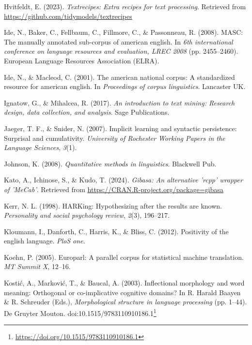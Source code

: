 \documentclass[
  letterpaper,
]{book}
\newlength{\cslhangindent}
\newenvironment{CSLReferences}[2] %
 {\begin{list}{}{%
  \setlength{\itemindent}{0pt}
  \setlength{\leftmargin}{0pt}
  \setlength{\parsep}{0pt}
  \ifodd #1
   \setlength{\leftmargin}{\cslhangindent}
   \setlength{\itemindent}{-1\cslhangindent}
  \fi
  \setlength{\itemsep}{#2\baselineskip}}}
 {\end{list}}
\theoremstyle{definition}
\theoremstyle{remark}
\DeclareRobustCommand{\href}[2]{#2\footnote{\url{#1}}}
\begin{document}
\begin{CSLReferences}{1}{0}
Hvitfeldt, E. (2023). \emph{Textrecipes: Extra recipes for text
processing}. Retrieved from
\url{https://github.com/tidymodels/textrecipes}

Ide, N., Baker, C., Fellbaum, C., Fillmore, C., \& Passonneau, R.
(2008). MASC: The manually annotated sub-corpus of american english. In
\emph{6th international conference on language resources and evaluation,
LREC 2008} (pp. 2455--2460). European Language Resources Association
(ELRA).

Ide, N., \& Macleod, C. (2001). The american national corpus: A
standardized resource for american english. In \emph{Proceedings of
corpus linguistics}. Lancaster UK.

Ignatow, G., \& Mihalcea, R. (2017). \emph{An introduction to text
mining: Research design, data collection, and analysis}. Sage
Publications.

Jaeger, T. F., \& Snider, N. (2007). Implicit learning and syntactic
persistence: Surprisal and cumulativity. \emph{University of Rochester
Working Papers in the Language Sciences}, \emph{3}(1).

Johnson, K. (2008). \emph{Quantitative methods in linguistics}.
Blackwell Pub.

Kato, A., Ichinose, S., \& Kudo, T. (2024). \emph{Gibasa: An alternative
'rcpp' wrapper of 'MeCab'}. Retrieved from
\url{https://CRAN.R-project.org/package=gibasa}

Kerr, N. L. (1998). HARKing: Hypothesizing after the results are known.
\emph{Personality and social psychology review}, \emph{2}(3), 196--217.

Kloumann, I., Danforth, C., Harris, K., \& Bliss, C. (2012). Positivity
of the english language. \emph{PloS one}.

Koehn, P. (2005). Europarl: A parallel corpus for statistical machine
translation. \emph{MT Summit X}, 12--16.

Kostić, A., Marković, T., \& Baucal, A. (2003). Inflectional morphology
and word meaning: Orthogonal or co-implicative cognitive domains? In R.
Harald Baayen \& R. Schreuder (Eds.), \emph{Morphological structure in
language processing} (pp. 1--44). De Gruyter Mouton.
doi:\href{https://doi.org/10.1515/9783110910186.1}{10.1515/9783110910186.1}


\end{CSLReferences}
\end{document}
